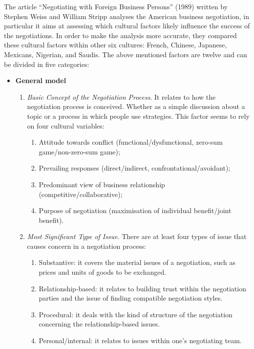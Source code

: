 \documentclass[../main.tex]{subfiles}
\begin{document}
The article “Negotiating with Foreign Business Persons” (1989) written by Stephen Weiss and William Stripp analyses the American business negotiation, in particular it aims at assessing which cultural factors likely influence the success of the negotiations. In order to make the analysis more accurate, they compared these cultural factors within other six cultures: French, Chinese, Japanese, Mexicans, Nigerian, and Saudis. The above mentioned factors are twelve and can be divided in five categories:
\begin{itemize}
    \item \textbf{General model}
    \begin{enumerate}
        \item \textit{Basic Concept of the Negotiation Process}. It relates to how the negotiation process is conceived. Whether as a simple discussion about a topic or a process in which people use strategies. This factor seems to rely on four cultural variables:
        \begin{enumerate}
            \item Attitude towards conflict (functional/dysfunctional, zero-sum game/non-zero-sum game); 
            \item Prevailing responses (direct/indirect, confrontational/avoidant);
            \item Predominant view of business relationship (competitive/collaborative);
            \item Purpose of negotiation (maximisation of individual benefit/joint benefit).
        \end{enumerate}
        
        \item \textit{Most Significant Type of Issue}. There are at least four types of issue that causes concern in a negotiation process:
        \begin{enumerate}
            \item Substantive: it covers the material issues of a negotiation, such as prices and units of goods to be exchanged.
            \item Relationship-based: it relates to building trust within the negotiation parties and the issue of finding compatible negotiation styles.
            \item Procedural: it deals with the kind of structure of the negotiation concerning the relationship-based issues.
            \item Personal/internal: it relates to issues within one's negotiating team.
        \end{enumerate}
        

\end{enumerate}
\end{itemize}
\end{document}
